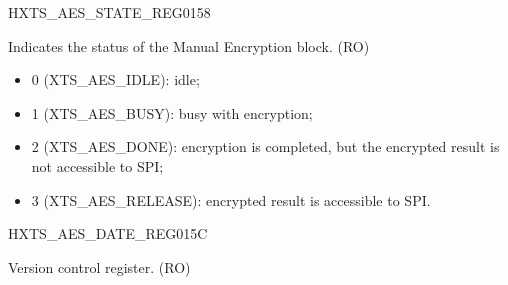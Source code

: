 \begin{register}{H}{XTS\_AES\_STATE\_REG}{\hexprefix{}0158}\label{regdesc:XTSAESSTATEREG}
%
%
\regnewline%
\begin{regdesc}\begin{reglist}
\label{fielddesc:XTSAESSTATE}\item [XTS\_AES\_STATE] Indicates the status of the Manual Encryption block. (RO)
\begin{itemize}
    \item \hexprefix{}0 (XTS\_AES\_IDLE): idle;
    \item \hexprefix{}1 (XTS\_AES\_BUSY): busy with encryption;
    \item \hexprefix{}2 (XTS\_AES\_DONE): encryption is completed, but the encrypted result is not accessible to SPI;
    \item \hexprefix{}3 (XTS\_AES\_RELEASE): encrypted result is accessible to SPI.
\end{itemize}

\end{reglist}\end{regdesc}
\end{register}


\begin{register}{H}{XTS\_AES\_DATE\_REG}{\hexprefix{}015C}\label{regdesc:XTSAESDATEREG}
%
%
\regnewline%
\begin{regdesc}\begin{reglist}
\label{fielddesc:XTSAESDATE}\item [XTS\_AES\_DATE] Version control register. (RO)
\end{reglist}\end{regdesc}
\end{register}

